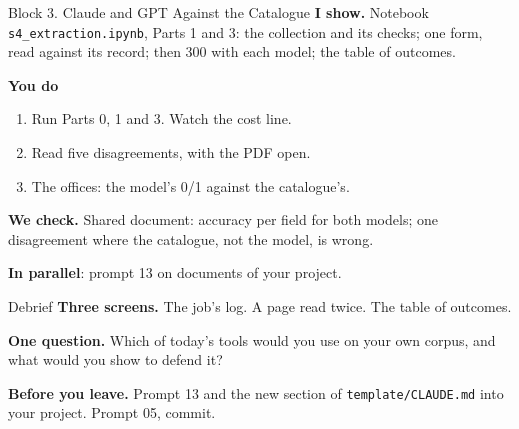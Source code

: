 \documentclass[svgnames,x11names,dvipsnames]{beamer}
\newcommand{\new}[1]{#1}
\begin{document}
\begin{frame}{Block 3. Claude and GPT Against the Catalogue}
\small
\textbf{I show.} \new{Notebook \texttt{s4\_extraction.ipynb}, Parts 1 and 3}: the collection and its checks; one form, read against its record; then 300 with each model; the table of outcomes.

\vspace{0.3cm}
\textbf{You do}
\begin{enumerate}
    \setlength{\itemsep}{3pt}
    \item \new{Run Parts 0, 1 and 3.} Watch the cost line.
    \item Read five disagreements, with the PDF open.
    \item The offices: the model's 0/1 against the catalogue's.
\end{enumerate}

\vspace{0.3cm}
\textbf{We check.} Shared document: accuracy per field for both models; one disagreement where the catalogue, not the model, is wrong.

\vspace{0.3cm}
\textbf{In parallel}: prompt 13 on documents of your project.
\end{frame}


\begin{frame}{Debrief}
\textbf{Three screens.} The job's log. A page read twice. The table of outcomes.

\vspace{0.4cm}
\textbf{One question.} Which of today's tools would you use on your own corpus, and what would you show to defend it?

\vspace{0.4cm}
\textbf{Before you leave.} \new{Prompt 13} and the new section of \texttt{template/CLAUDE.md} into your project. Prompt 05, commit.
\end{frame}
\end{document}
